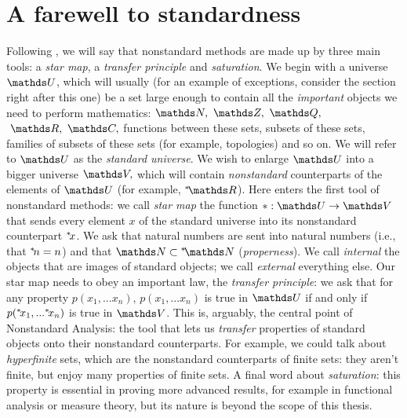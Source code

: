 \documentclass[draft.tex]{subfiles}
\begin{document}
\section{A farewell to standardness}
Following \cite{eightfold}, we will say that nonstandard methods are made up by three main tools: a \emph{star map}, a \emph{transfer principle} and \emph{saturation}. We begin with a universe $\struct{U}$, which will usually (for an example of exceptions, consider the section right after this one) be a set large enough to contain all the \textit{important} objects we need to perform mathematics: $\NN, \ \ZZ, \ \QQ,$ $\ \RR, \ \CC,$ functions between these sets, subsets of these sets, families of subsets of these sets (for example, topologies) and so on. We will refer to $\struct{U}$ as the \emph{standard universe}. We wish to enlarge $\struct{U}$ into a bigger universe $\struct{V},$ which will contain \emph{nonstandard} counterparts of the elements of $\struct{U}$ (for example, $\ns{\RR}$). Here enters the first tool of nonstandard methods: we call \emph{star map} the function $\ast: \struct{U} \to \struct{V}$ that sends every element $x$ of the standard universe into its nonstandard counterpart ${{}^{*}\!{x}}$. We ask that natural numbers are sent into natural numbers (i.e., that ${{}^{*}\!{n}} = n$) and that $\NN \subset \ns{\NN}$ (\emph{properness}). We call \emph{internal} the objects that are images of standard objects; we call \emph{external} everything else. Our star map needs to obey an important law, the \emph{transfer principle}: we ask that for any property $p(x_1, ... x_n)$, $p(x_1, ... x_n)$ is true in $\struct{U}$ if and only if $p({{}^{*}\!{x_1}}, ... {{}^{*}\!{x_n}})$ is true in $\struct{V}$. This is, arguably, the central point of Nonstandard Analysis: the tool that lets us \textit{transfer} properties of standard objects onto their nonstandard counterparts. For example, we could talk about \textit{hyperfinite} sets, which are the nonstandard counterparts of finite sets: they aren't finite, but enjoy many properties of finite sets. A final word about \emph{saturation}: this property is essential in proving more advanced results, for example in functional analysis or measure theory, but its nature is beyond the scope of this thesis.
\end{document}
